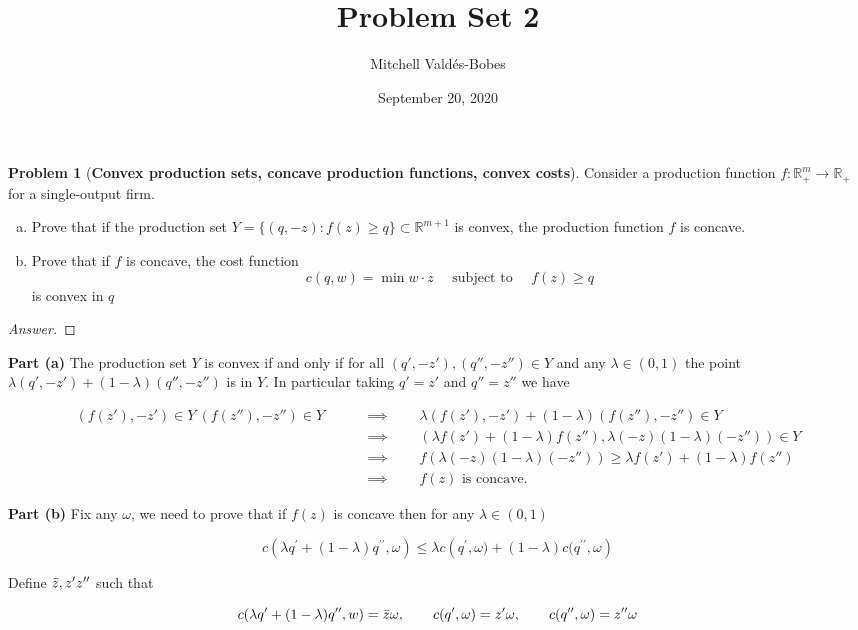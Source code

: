 \documentclass{article}
\title{Problem Set 2}
\author{Mitchell Valdés-Bobes}
\date{September 20, 2020}
\theoremstyle{definition}
\newtheorem{problem}{Problem}
\newcommand{\qiq}{\qquad \implies \qquad}
\begin{document}
\maketitle
\begin{problem}[\textbf{Convex production sets, concave production functions, convex costs}]

Consider a production function $f: \mathbb{R}_{+}^{m} \rightarrow \mathbb{R}_{+}$ for a single-output firm.
\begin{enumerate}[(a)]
    \item Prove that if the production set $Y=\{(q,-z): f(z) \geq q\} \subset \mathbb{R}^{m+1}$ is convex, the production function $f$ is concave.
    \item Prove that if $f$ is concave, the cost function
        $$
        c(q, w)=\min w \cdot z \quad \text { subject to } \quad f(z) \geq q
        $$
    is convex in $q$
\end{enumerate}

\end{problem}
\begin{proof}[Answer]

\end{proof}
\textbf{Part (a)}
The production set $Y$ is convex if and only if for all $(q', -z'), (q'', -z'') \in Y$ and any $\lambda \in (0,1)$ the point $\lambda (q', -z') + (1-\lambda)(q'', -z'')$ is in $Y$. In particular taking $q' = z'$ and $q''=z''$ we have

\begin{align*}
    (f(z'), -z')\in Y\: (f(z''), -z'')\in Y &\qiq  \lambda (f(z'), -z') + (1-\lambda)(f(z''), -z'') \in Y\\
    &\qiq  (\lambda f(z') + (1-\lambda) f(z''),  \lambda(-z)(1-\lambda) (-z'') ) \in Y \\
    &\qiq f (\lambda(-z)(1-\lambda) (-z'') ) \geq \lambda f(z') + (1-\lambda) f(z'')\\
    &\qiq f(z)\text{ is concave.}
\end{align*}

\textbf{Part (b)} 
Fix any $\omega$, we need to prove that if $f(z)$ is concave then for any  $\lambda \in(0, 1)$

$$c\left(\lambda q^{\prime}+(1-\lambda) q^{\prime \prime}, \omega\right) \leq \lambda c\left(q^{\prime}, \omega)+(1-\lambda) c(q^{\prime \prime}, \omega\right)$$

Define $\Bar{z}, z^{\prime}z^{\prime\prime}$ such that

$$c(\lambda q^{\prime}+(1-\lambda) q^{\prime \prime}, w) = \Bar{z}\omega, \qquad  c(q^{\prime},\omega) = z^{\prime}\omega ,\qquad c(q^{\prime \prime}, \omega) = z^{\prime \prime} \omega$$
\end{document}
